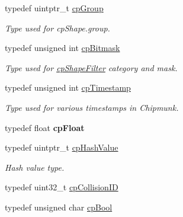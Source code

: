 \begin{DoxyCompactItemize}
\mbox{\label{group__basicTypes_gacd811b1135a8f4a3e5cc019552b18b1a}} 
typedef uintptr\+\_\+t \hyperlink{group__basicTypes_gacd811b1135a8f4a3e5cc019552b18b1a}{cp\+Group}
\begin{DoxyCompactList}\small\item\em Type used for cp\+Shape.\+group. \end{DoxyCompactList}\item 
\mbox{\label{group__basicTypes_gae7ff94f62e00cae288c1991958822743}} 
typedef unsigned int \hyperlink{group__basicTypes_gae7ff94f62e00cae288c1991958822743}{cp\+Bitmask}
\begin{DoxyCompactList}\small\item\em Type used for \hyperlink{structcpShapeFilter}{cp\+Shape\+Filter} category and mask. \end{DoxyCompactList}\item 
\mbox{\label{group__basicTypes_gaa24652c104082d0725066ea5ac7dc83f}} 
typedef unsigned int \hyperlink{group__basicTypes_gaa24652c104082d0725066ea5ac7dc83f}{cp\+Timestamp}
\begin{DoxyCompactList}\small\item\em Type used for various timestamps in Chipmunk. \end{DoxyCompactList}\item 
\mbox{\label{group__basicTypes_gadd61042e5d8fad8697df27a086533d19}} 
typedef float {\bfseries cp\+Float}
\item 
\mbox{\label{group__basicTypes_gae7eb4775a9f43914a15553ca65a048f4}} 
typedef uintptr\+\_\+t \hyperlink{group__basicTypes_gae7eb4775a9f43914a15553ca65a048f4}{cp\+Hash\+Value}
\begin{DoxyCompactList}\small\item\em Hash value type. \end{DoxyCompactList}\item 
typedef uint32\+\_\+t \hyperlink{group__basicTypes_ga89d4043ca0567e947aaca19cf9600df5}{cp\+Collision\+ID}
\item 
\mbox{\label{group__basicTypes_gabc5e752c48f3449ca26ef413ecbd647e}} 
typedef unsigned char \hyperlink{group__basicTypes_gabc5e752c48f3449ca26ef413ecbd647e}{cp\+Bool}

\end{DoxyCompactItemize}
